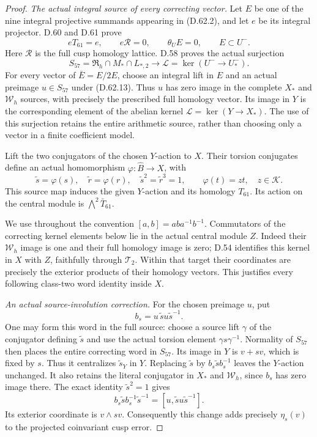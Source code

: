 \begin{proof}
\emph{The actual integral source of every correcting vector.}
Let \(E\) be one of the nine integral
projective summands appearing in (D.62.2),
and let \(e\) be its integral projector.
D.60 and D.61 prove
\[
 eT_{61}=e,\qquad e\mathcal R=0,
 \qquad\theta_U E=0,\qquad E\subset U^-.
 \tag{D.62.12}
\]
Here \(\mathcal R\) is the full cusp
homology lattice. D.58 proves the actual
surjection
\[
 S_{57}=\mathfrak R_h\cap M_*\cap L_{*,2}
       \longrightarrow
 \mathcal L=\ker(U^-\to U_*^-).
 \tag{D.62.13}
\]
For every vector of \(\bar E=E/2E\),
choose an integral lift in \(E\)
and an actual preimage \(u\in S_{57}\)
under (D.62.13). Thus \(u\) has zero
image in the complete \(X_*\) and
\(\mathcal W_h\) sources, with precisely
the prescribed full homology vector.
Its image in \(Y\) is the corresponding
element of the abelian kernel
\(\mathcal L=\ker(Y\to X_*)\).
The use of this surjection retains the
entire arithmetic source, rather than
choosing only a vector in a finite
coefficient model.

Lift the two conjugators of the chosen
\(Y\)-action to \(X\). Their torsion
conjugates define an actual homomorphism
\(\varphi:\widehat B\to X\), with
\[
 \widetilde s=\varphi(s),\quad
 \widetilde r=\varphi(r),\quad
 \widetilde s^2=\widetilde r^3=1,
 \qquad\varphi(t)=zt,\quad z\in\mathcal K.
 \tag{D.62.14}
\]
This source map induces the given
\(Y\)-action and its homology
\(T_{61}\). Its action on the central
module is \(\bigwedge^2\bar T_{61}\).

We use throughout the convention
\([a,b]=aba^{-1}b^{-1}\).
Commutators of the correcting kernel
elements below lie in the actual
central module \(Z\). Indeed their
\(\mathcal W_h\) image is one and
their full homology image is zero;
D.54 identifies this kernel in \(X\)
with \(Z\), faithfully through
\(\mathcal T_2\). Within that target
their coordinates are precisely the
exterior products of their homology
vectors. This justifies every following
class-two word identity inside \(X\).

\emph{An actual source-involution correction.}
For the chosen preimage \(u\), put
\[
 b_s=u\,\widetilde s u\widetilde s^{-1}.
 \tag{D.62.15}
\]
One may form this word in the full source:
choose a source lift \(\gamma\) of the
conjugator defining \(\widetilde s\) and
use the actual torsion element
\(\gamma s\gamma^{-1}\).
Normality of \(S_{57}\) then places
the entire correcting word in \(S_{57}\).
Its image in \(Y\) is \(v+sv\),
which is fixed by \(s\). Thus it
centralizes \(\widetilde s_Y\) in
\(Y\). Replacing \(\widetilde s\)
by \(b_s\widetilde s b_s^{-1}\)
leaves the \(Y\)-action unchanged.
It also retains the literal conjugator
in \(X_*\) and \(\mathcal W_h\),
since \(b_s\) has zero image there.
The exact identity \(\widetilde s^2=1\)
gives
\[
 b_s\widetilde s b_s^{-1}\widetilde s^{-1}
   =[u,\widetilde s u\widetilde s^{-1}].
 \tag{D.62.16}
\]
Its exterior coordinate is \(v\wedge sv\).
Consequently this change adds precisely
\(\eta_s(v)\) to the projected
coinvariant cusp error.


\end{proof}
